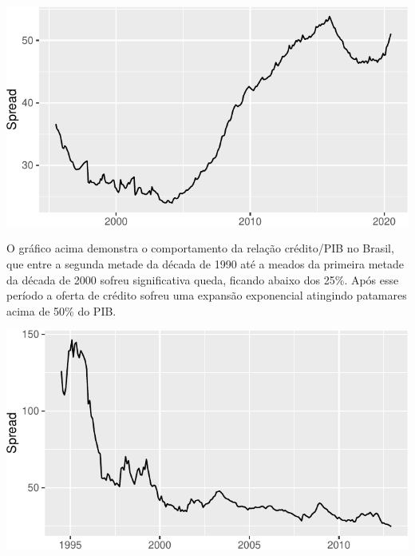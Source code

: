 \documentclass[12pt,openright,oneside,a4paper,chapter=TITLE,section=TITLE,subsection=Title,english,french,spanish,portugues,sumario=tradicional]{04-class-files/abntex2}
\begin{document}

\begin{center}\includegraphics{12-exportedfigures/credit gdp-1} \end{center}

\label{fig:credgdp}

O gráfico acima demonstra o comportamento da relação crédito/PIB no Brasil, que entre a segunda metade da década de 1990 até a meados da primeira metade da década de 2000 sofreu significativa queda, ficando abaixo dos 25\%. Após esse período a oferta de crédito sofreu uma expansão exponencial atingindo patamares acima de 50\% do PIB.


\begin{center}\includegraphics{12-exportedfigures/average spread-1} \end{center}

\label{fig:spread2012}
\end{document}
